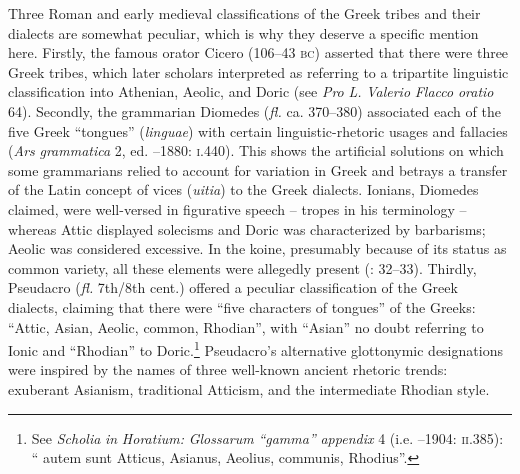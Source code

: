 Three Roman and early medieval classifications of the Greek tribes and their dialects are somewhat peculiar, which is why they deserve a specific mention here. Firstly, the famous orator Cicero (106–43 \textsc{bc}) asserted that there were three Greek tribes, which later scholars interpreted as referring to a tripartite linguistic classification into Athenian, Aeolic, and Doric (see \textit{Pro} \textit{L.} \textit{Valerio} \textit{Flacco} \textit{oratio} 64). Secondly, the grammarian Diomedes (\textit{fl.} ca. 370–380) associated each of the five Greek “tongues” (\textit{linguae}) with certain linguistic-rhetoric usages and fallacies (\textit{Ars} \textit{grammatica} 2, ed. \citealt{Keil1855}–1880: \textsc{i}.440). This shows the artificial solutions on which some grammarians relied to account for variation in Greek and betrays a transfer of the Latin concept of vices (\textit{uitia}) to the Greek dialects. Ionians, Diomedes claimed, were well-versed in figurative speech – tropes in his terminology – whereas Attic displayed solecisms and Doric was characterized by barbarisms; Aeolic was considered excessive. In the koine, presumably because of its status as common variety, all these elements were allegedly present (\citealt{Consani1991}: 32–33). Thirdly, Pseudacro (\textit{fl.} 7th/8th cent.) offered a peculiar classification of the Greek dialects, claiming that there were “five characters of tongues” of the Greeks: “Attic, Asian, Aeolic, common, Rhodian”, with “Asian” no doubt referring to Ionic and “Rhodian” to Doric.\footnote{ \textrm{See} \textrm{\textit{Scholia} \textit{in} \textit{Horatium:} \textit{Glossarum} \textit{“gamma”} \textit{appendix}} \textrm{4 (i.e. \citealt{Pseudacro1902}–1904:} \textrm{\textsc{ii.}}\textrm{385): “} autem sunt  Atticus, Asianus, Aeolius, communis, Rhodius\textrm{”.}} Pseudacro’s alternative glottonymic designations were inspired by the names of three well-known ancient rhetoric trends: exuberant Asianism, traditional Atticism, and the intermediate Rhodian style.

